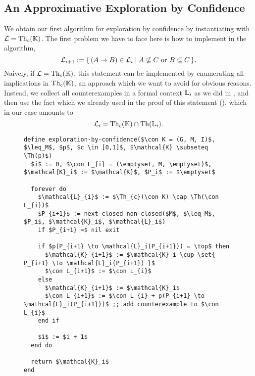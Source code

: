 \subsection{An Approximative Exploration by Confidence}
\label{sec:expl-conf-1}

We obtain our first algorithm for exploration by confidence by instantiating
 with $\mathcal{L} = \operatorname{Th}_{c}({\mathbb{K}})$.  The first problem
we have to face here is how to implement  in the
algorithm, \ie
\begin{equation*}
  \mathcal{L}_{i+1} := {\{\, (A \to B) \in \mathcal{L}_{i} \mid A \not\subseteq C \text{
      or } B \subseteq C \,\}}.
\end{equation*}
Naively, if $\mathcal{L} = \operatorname{Th}_{c}({\mathbb{K}})$, this statement can be implemented by
enumerating all implications in $\operatorname{Th}_{c}({\mathbb{K}})$, an approach which we want to avoid for
obvious reasons.  Instead, we collect all counterexamples in a formal context ${\mathbb{L}}_{i}$
as we did in , and then use the
fact which we already used in the proof of this statement (), which in our
case amounts to
\begin{equation*}
  \mathcal{L}_{i} = \operatorname{Th}_{c}({\mathbb{K}}) \cap \operatorname{Th}({\mathbb{L}}_{i}).
\end{equation*}


\begin{figure}[tp]
  \centering
  \begin{Algorithm}
    \label{alg:exploration-by-confidence-first-version}
    \hspace*{0cm}
\begin{lstlisting}
define exploration-by-confidence($\con K = (G, M, I)$, $\leq_M$, $p$, $c \in [0,1]$, $\mathcal{K} \subseteq \Th(p)$)
  $i$ := 0, $\con L_{i} = (\emptyset, M, \emptyset)$, $\mathcal{K}_i$ := $\mathcal{K}$, $P_i$ := $\emptyset$

  forever do
    $\mathcal{L}_{i}$ := $\Th_{c}(\con K) \cap \Th(\con L_{i})$
    $P_{i+1}$ := next-closed-non-closed($M$, $\leq_M$, $P_i$, $\mathcal{K}_i$, $\mathcal{L}_i$)
    if $P_{i+1} =$ nil exit

    if $p(P_{i+1} \to \mathcal{L}_i(P_{i+1})) = \top$ then
      $\mathcal{K}_{i+1}$ := $\mathcal{K}_i \cup \set{ P_{i+1} \to \mathcal{L}_i(P_{i+1}) }$
      $\con L_{i+1}$ := $\con L_{i}$
    else
      $\mathcal{K}_{i+1}$ := $\mathcal{K}_i$
      $\con L_{i+1}$ := $\con L_{i} + p(P_{i+1} \to \mathcal{L}_i(P_{i+1}))$ ;; add counterexample to $\con L_{i}$
    end if

    $i$ := $i + 1$
  end do

  return $\mathcal{K}_i$  
end
\end{lstlisting}
  \end{Algorithm}
\end{figure}


